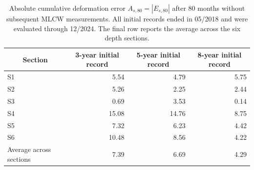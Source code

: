\begin{table}[htbp]
  \centering
  \small
  \renewcommand{\arraystretch}{1.15}
  \caption[Absolute cumulative deformation error without subsequent MLCW measurements.]{Absolute cumulative deformation error $A_{s,80}=|E_{s,80}|$ after 80 months without subsequent MLCW measurements. All initial records ended in 05/2018 and were evaluated through 12/2024. The final row reports the average across the six depth sections.}
  \label{tab:results_no_subsequent_mlcw_h80}
  \begin{tabular}{l|r|r|r}
    \toprule
    \multicolumn{1}{c|}{\textbf{Section}} & \multicolumn{1}{c|}{\textbf{3-year initial record}} & \multicolumn{1}{c|}{\textbf{5-year initial record}} & \multicolumn{1}{c}{\textbf{8-year initial record}} \\
    \midrule
    S1 & 5.54 & 4.79 & 5.75 \\
    S2 & 5.26 & 2.25 & 2.44 \\
    S3 & 0.69 & 3.53 & 0.14 \\
    S4 & 15.08 & 14.76 & 8.75 \\
    S5 & 7.32 & 6.23 & 4.42 \\
    S6 & 10.48 & 8.56 & 4.22 \\
    \midrule
    Average across sections & 7.39 & 6.69 & 4.29 \\
    \bottomrule
  \end{tabular}
\end{table}

\FloatBarrier
